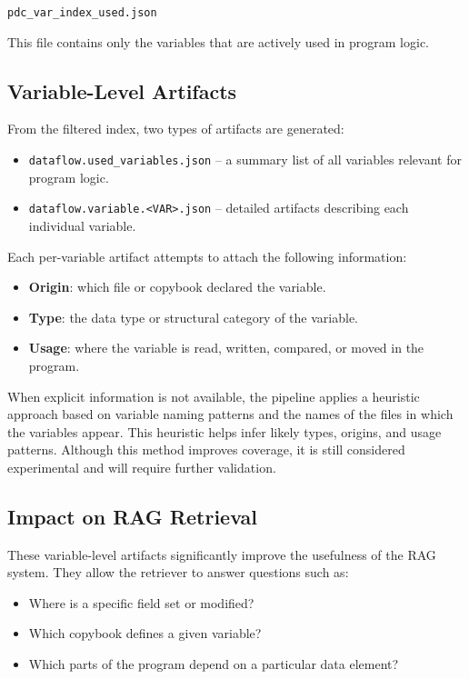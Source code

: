 \documentclass[11pt]{article}
\begin{document}
\begin{center}
\texttt{pdc\_var\_index\_used.json}
\end{center}

This file contains only the variables that are actively used in program logic.

\subsection*{Variable-Level Artifacts}

From the filtered index, two types of artifacts are generated:

\begin{itemize}
\item \texttt{dataflow.used\_variables.json} -- a summary list of all variables relevant for program logic.
\item \texttt{dataflow.variable.\textless VAR\textgreater.json} -- detailed artifacts describing each individual variable.
\end{itemize}

Each per-variable artifact attempts to attach the following information:

\begin{itemize}
\item \textbf{Origin}: which file or copybook declared the variable.
\item \textbf{Type}: the data type or structural category of the variable.
\item \textbf{Usage}: where the variable is read, written, compared, or moved in the program.
\end{itemize}

When explicit information is not available, the pipeline applies a heuristic approach based on variable naming patterns and the names of the files in which the variables appear. This heuristic helps infer likely types, origins, and usage patterns. Although this method improves coverage, it is still considered experimental and will require further validation.

\subsection*{Impact on RAG Retrieval}

These variable-level artifacts significantly improve the usefulness of the RAG system. They allow the retriever to answer questions such as:

\begin{itemize}
\item Where is a specific field set or modified?
\item Which copybook defines a given variable?
\item Which parts of the program depend on a particular data element?
\end{itemize}
\end{document}
